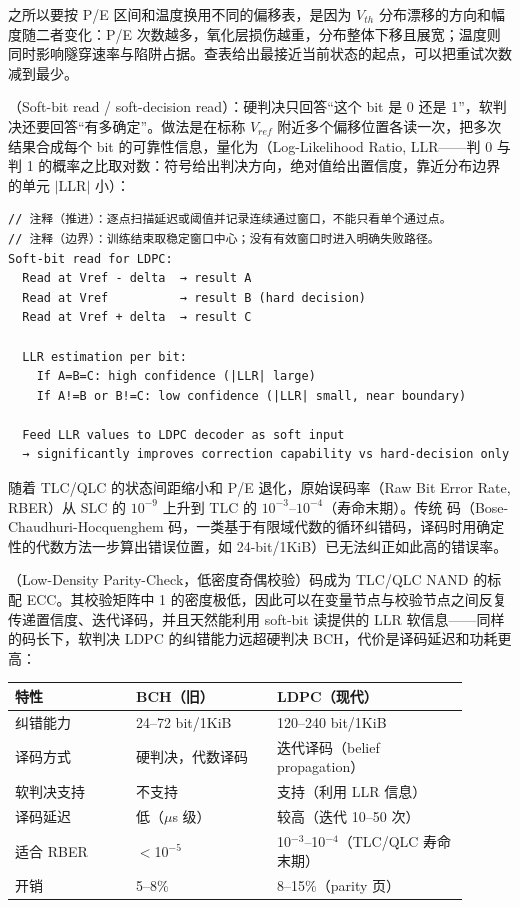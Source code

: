 之所以要按 P/E 区间和温度换用不同的偏移表，是因为 $V_{th}$ 分布漂移的方向和幅度随二者变化：P/E 次数越多，氧化层损伤越重，分布整体下移且展宽；温度则同时影响隧穿速率与陷阱占据。查表给出最接近当前状态的起点，可以把重试次数减到最少。

（Soft-bit read / soft-decision read）：硬判决只回答“这个 bit 是 0 还是 1”，软判决还要回答“有多确定”。做法是在标称 $V_{ref}$ 附近多个偏移位置各读一次，把多次结果合成每个 bit 的可靠性信息，量化为（Log-Likelihood Ratio, LLR——判 0 与判 1 的概率之比取对数：符号给出判决方向，绝对值给出置信度，靠近分布边界的单元 $|$LLR$|$ 小）：

\begin{lstlisting}
// 注释（推进）：逐点扫描延迟或阈值并记录连续通过窗口，不能只看单个通过点。
// 注释（边界）：训练结束取稳定窗口中心；没有有效窗口时进入明确失败路径。
Soft-bit read for LDPC:
  Read at Vref - delta  → result A
  Read at Vref          → result B (hard decision)
  Read at Vref + delta  → result C

  LLR estimation per bit:
    If A=B=C: high confidence (|LLR| large)
    If A!=B or B!=C: low confidence (|LLR| small, near boundary)

  Feed LLR values to LDPC decoder as soft input
  → significantly improves correction capability vs hard-decision only
\end{lstlisting}


随着 TLC/QLC 的状态间距缩小和 P/E 退化，原始误码率（Raw Bit Error Rate, RBER）从 SLC 的 $10^{-9}$ 上升到 TLC 的 $10^{-3}$--$10^{-4}$（寿命末期）。传统  码（Bose-Chaudhuri-Hocquenghem 码，一类基于有限域代数的循环纠错码，译码时用确定性的代数方法一步算出错误位置，如 24-bit/1KiB）已无法纠正如此高的错误率。

（Low-Density Parity-Check，低密度奇偶校验）码成为 TLC/QLC NAND 的标配 ECC。其校验矩阵中 1 的密度极低，因此可以在变量节点与校验节点之间反复传递置信度、迭代译码，并且天然能利用 soft-bit 读提供的 LLR 软信息——同样的码长下，软判决 LDPC 的纠错能力远超硬判决 BCH，代价是译码延迟和功耗更高：

\begin{longtable}{L{0.24\linewidth}L{0.28\linewidth}L{0.38\linewidth}}
\toprule
特性 & BCH（旧） & LDPC（现代） \\
\midrule
纠错能力 & 24--72 bit/1KiB & 120--240 bit/1KiB \\\tablerowrule
译码方式 & 硬判决，代数译码 & 迭代译码（belief propagation） \\\tablerowrule
软判决支持 & 不支持 & 支持（利用 LLR 信息） \\\tablerowrule
译码延迟 & 低（$\mu$s 级） & 较高（迭代 10--50 次） \\\tablerowrule
适合 RBER & $<$10$^{-5}$ & 10$^{-3}$--10$^{-4}$（TLC/QLC 寿命末期） \\\tablerowrule
开销 & 5--8\% & 8--15\%（parity 页） \\
\bottomrule
\end{longtable}

